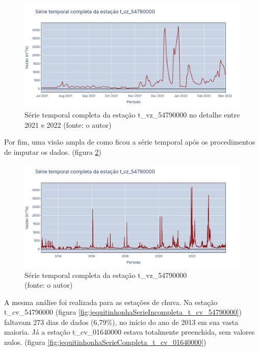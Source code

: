 \begin{figure}[!h]
	\centering
	\includegraphics[scale=0.25]{Figuras/jequiti/jequitinhonhaSerieCompleta_t_vz_54790000-2021_2022.png}
	\caption{Série temporal completa da estação t\_vz\_54790000 no detalhe entre 2021 e 2022 (fonte: o autor)}
	\label{fig:jequitinhonhaSerieCompleta_t_vz_54790000-2021_2022}
\end{figure}

Por fim, uma visão ampla de como ficou a série temporal após os procedimentos de imputar os dados. (figura \ref{fig:jequitinhonhaSerieCompleta_t_vz_54790000})

\begin{figure}[!h]
	\centering
	\includegraphics[scale=0.25]{Figuras/jequiti/jequitinhonhaSerieCompleta_t_vz_54790000.png}
	\caption{Série temporal completa da estação t\_vz\_54790000\\(fonte: o autor)}
	\label{fig:jequitinhonhaSerieCompleta_t_vz_54790000}
\end{figure}

A mesma análise foi realizada para as estações de chuva. Na estação t\_cv\_54790000 (figura \ref{fig:jequitinhonhaSerieIncompleta_t_cv_54790000}) faltavam 273 dias de dados (6,79\%), no início do ano de 2013 em sua vasta maioria. Já a estação t\_cv\_01640000 estava totalmente preenchida, sem valores nulos. (figura \ref{fig:jequitinhonhaSerieCompleta_t_cv_01640000})

